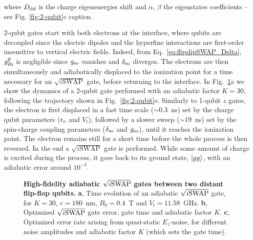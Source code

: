 \documentclass[aps,prb,superscriptaddress,nobibnotes,twocolumn]{revtex4-1}
\begin{document}
where $D_{\rm dd}$ is the charge eigenenergies shift and $\alpha$, $\beta$ the eigenstates coefficients -- see Fig. \ref{fig:2-qubit}c caption.

2-qubit gates start with both electrons at the interface, where qubits are decoupled since the electric dipoles and the hyperfine interactions are first-order insensitive to vertical electric fields. Indeed, from Eq.~\ref{eq:flipdipSWAP_Delta}, $g_{\rm 2q}^{\rm ff}$ is negligible since $g_{\rm so}$ vanishes and $\delta_{\rm so}$ diverges. The electrons are then simultaneously and adiabatically displaced to the ionization point for a time necessary for an $\sqrt{i\mathrm{SWAP}}$ gate, before returning to the interface. In Fig.~\ref{fig:iSWAP}a we show the dynamics of a 2-qubit gate performed with an adiabatic factor $K=30$, following the trajectory shown in Fig.~\ref{fig:2-qubit}e. Similarly to 1-qubit $z$ gates, the electron is first displaced in a fast time scale ($\sim0.3$~ns) set by the charge qubit parameters ($\epsilon_{\rm o}$ and $V_t$), followed by a slower sweep ($\sim19$~ns) set by the spin-charge coupling parameters ($\delta_{\rm so}$ and $g_{\rm so}$), until it reaches the ionization point. The electron remains still for a short time before the whole process is then reversed. In the end a $\sqrt{i\mathrm{SWAP}}$ gate is performed. While some amount of charge is excited during the process, it goes back to its ground state, $\ket{gg}$, with an adiabatic error around $10^{-3}$.


\begin{figure*}
	\centering
	\caption{\textbf{High-fidelity adiabatic $\sqrt{i{\rm SWAP}}$ gates between two distant flip-flop qubits.}
		\textbf{a}, Time evolution of an adiabatic $\sqrt{i \rm SWAP}$ gate, for $K=30$, $r=180$~nm, $B_0=0.4$~T and $V_t=11.58$~GHz.
		\textbf{b}, Optimized $\sqrt{i{\rm SWAP}}$ gate error, gate time and adiabatic factor $K$.
		\textbf{c}, Optimized error rate arising from quasi-static $E_z$-noise, for different noise amplitudes and adiabatic factor $K$ (which sets the gate time).}
	\label{fig:iSWAP}
\end{figure*}
\end{document}
